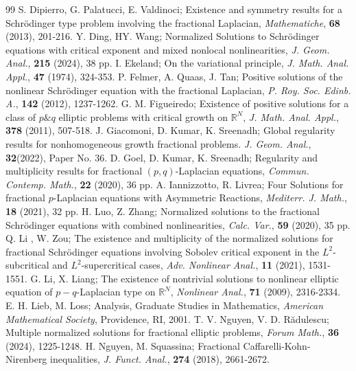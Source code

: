\documentclass[10pt,a4paper]{amsart}
\numberwithin{equation}{section}
\begin{document}
\begin{thebibliography}{99}
 S. Dipierro, G. Palatucci, E. Valdinoci; Existence and symmetry results for a Schr\"{o}dinger type problem involving the fractional Laplacian, \emph{Mathematiche}, \textbf{68} (2013), 201-216.
 Y. Ding, HY. Wang; Normalized Solutions to Schr\"{o}dinger equations with critical exponent and mixed nonlocal nonlinearities, \emph{ J. Geom. Anal.}, \textbf{215} (2024), 38 pp.
 I. Ekeland; On the variational principle, \emph{J. Math. Anal. Appl.}, \textbf{47} (1974), 324-353.
 P. Felmer, A. Quaas, J. Tan; Positive solutions of the nonlinear Schr\"{o}dinger equation with the fractional Laplacian, \emph{P. Roy. Soc. Edinb. A.}, \textbf{142} (2012), 1237-1262.
 G. M. Figueiredo; Existence of positive solutions for a class of $p\&q$ elliptic problems with critical growth on $\mathbb{R}^N$, \emph{J. Math. Anal. Appl.}, \textbf{378} (2011), 507-518.
 J. Giacomoni, D. Kumar,  K. Sreenadh; Global regularity results for nonhomogeneous growth fractional problems. \emph{J. Geom. Anal.}, \textbf{32}(2022), Paper No. 36.
 D. Goel, D. Kumar, K. Sreenadh; Regularity and multiplicity results for fractional $(p, q)$-Laplacian equations, \emph{Commun. Contemp. Math.}, \textbf{22} (2020), 36 pp.
 A. Iannizzotto, R. Livrea; Four Solutions for fractional $p$-Laplacian equations with Asymmetric Reactions, \emph{Mediterr. J. Math.}, \textbf{18} (2021), 32 pp.
 H. Luo, Z. Zhang; Normalized solutions to the fractional Schr\"{o}dinger equations with combined nonlinearities, \emph{Calc. Var.}, \textbf{59} (2020), 35 pp.
 Q. Li , W. Zou; The existence and multiplicity of the normalized solutions for fractional Schr\"{o}dinger equations involving Sobolev critical exponent in the $L^2$-subcritical and $L^2$-supercritical cases, \emph{Adv. Nonlinear Anal.}, \textbf{11} (2021), 1531-1551.
 G. Li, X. Liang; The existence of nontrivial solutions to nonlinear elliptic equation of $p-q$-Laplacian type on $\mathbb{R}^N$, \emph{Nonlinear Anal.}, \textbf{71} (2009), 2316-2334.
 E. H. Lieb, M. Loss; Analysis, Graduate Studies in Mathematics, \emph{American Mathematical Society}, Providence, RI, 2001.
 T. V. Nguyen, V. D. R\u{a}dulescu; Multiple normalized solutions for fractional elliptic problems, \emph{Forum Math.}, \textbf{36} (2024), 1225-1248.
 H. Nguyen,  M. Squassina; Fractional Caffarelli-Kohn-Nirenberg inequalities, \emph{J. Funct. Anal.}, \textbf{274} (2018), 2661-2672.

\end{thebibliography}
\end{document}
